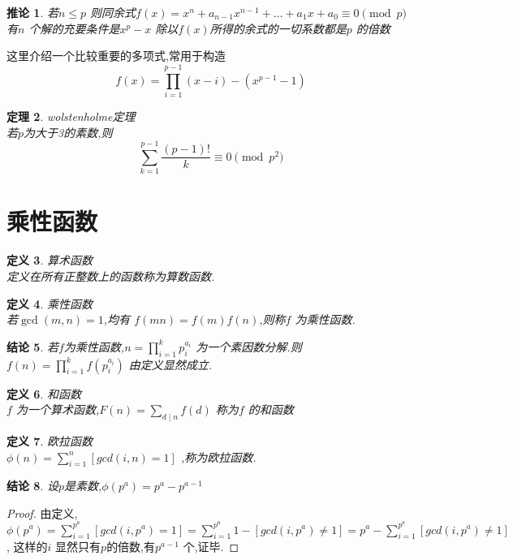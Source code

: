 \documentclass[12pt, a4paper, oneside]{ctexbook}
\newtheorem{theorem}{定理}[section]
\newtheorem{definition}[theorem]{定义}
\newtheorem{corollary}[theorem]{推论}
\newtheorem{proposition}[theorem]{结论}
\begin{document}
\begin{corollary}
  若$n \leq p$ 则同余式$f(x)=x^n+a_{n-1}x^{n-1}+\dots +a_1x+a_0 \equiv 0 \pmod{p}$有$n$ 
  个解的充要条件是$x^p-x$ 除以$f(x)$所得的余式的一切系数都是$p$ 的倍数
\end{corollary}
这里介绍一个比较重要的多项式,常用于构造\\
$$
f(x)=\prod_{i=1}^{p-1}(x-i) -(x^{p-1}-1)
$$ 

\begin{theorem}
  wolstenholme定理\\
  若$p$为大于3的素数,则
  $$
  \sum_{k=1}^{p-1} \frac{(p-1)!}{k} \equiv 0 \pmod{p^2} 
  $$
\end{theorem}



\section{乘性函数}

\begin{definition}
  算术函数\\
  定义在所有正整数上的函数称为算数函数.
\end{definition}

\begin{definition}
  乘性函数\\
  若$\gcd(m,n)=1$,均有 $f(mn)=f(m)f(n)$,则称$f$ 为乘性函数.
\end{definition}

\begin{proposition}
  若$f$为乘性函数,$n=\prod_{i=1}^{k} p_i^{a_i}$ 为一个素因数分解.则$f(n)=\prod_{i=1}^k f(p_i^{a_i})$
由定义显然成立.
\end{proposition}

\begin{definition}
  和函数\\
  $f$ 为一个算术函数,$F(n)=\sum_{d \mid n} f(d)$ 称为$f$ 的和函数
\end{definition}

\begin{definition}
  欧拉函数\\
  $\phi(n)=\sum_{i=1}^n [gcd(i,n)=1]$ ,称为欧拉函数.
\end{definition}

\begin{proposition}
  设$p$是素数,$\phi(p^a)=p^a-p^{a-1} $
\end{proposition}

\begin{proof}
  由定义,$\phi(p^a)= \sum_{i=1}^{p^a} [gcd(i,p^a)=1]= \sum_{i=1}^{p^a} 1-[gcd(i,p^a) \neq 1]=p^a- \sum_{i=1}^{p^a} [gcd(i,p^a) \neq 1]$,
  这样的$i$ 显然只有$p$的倍数,有$p^{a-1}$ 个,证毕.
\end{proof}
\end{document}
